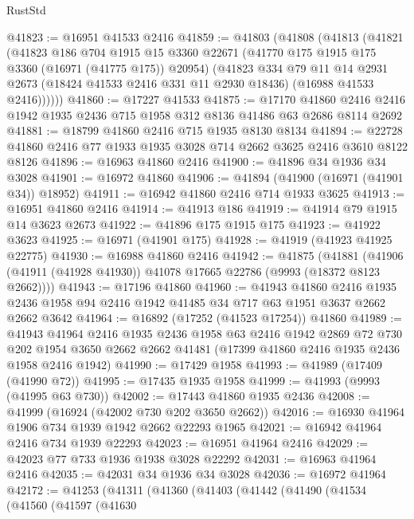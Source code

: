 \begin{lexlean}{RustStd}
\begin{coremodule}
@41823 := @16951 @41533 @2416
@41859 := @41803
    (@41808
      (@41813
        (@41821
          (@41823
            @186
            @704
            @1915
            @15
            @3360
            @22671
            (@41770 @175 @1915 @175 @3360 (@16971 (@41775 @175)) @20954)
            (@41823
              @334
              @79
              @11
              @14
              @2931
              @2673
              (@18424 @41533 @2416 @331 @11 @2930 @18436)
              (@16988 @41533 @2416))))))
@41860 := @17227 @41533
@41875 := @17170
    @41860
    @2416
    @2416
    @1942
    @1935
    @2436
    @715
    @1958
    @312
    @8136
    @41486
    @63
    @2686
    @8114
    @2692
@41881 := @18799 @41860 @2416 @715 @1935 @8130 @8134
@41894 := @22728 @41860 @2416 @77 @1933 @1935 @3028 @714 @2662 @3625 @2416 @3610 @8122 @8126
@41896 := @16963 @41860 @2416
@41900 := @41896 @34 @1936 @34 @3028
@41901 := @16972 @41860
@41906 := @41894 (@41900 (@16971 (@41901 @34)) @18952)
@41911 := @16942 @41860 @2416 @714 @1933 @3625
@41913 := @16951 @41860 @2416
@41914 := @41913 @186
@41919 := @41914 @79 @1915 @14 @3623 @2673
@41922 := @41896 @175 @1915 @175
@41923 := @41922 @3623
@41925 := @16971 (@41901 @175)
@41928 := @41919 (@41923 @41925 @22775)
@41930 := @16988 @41860 @2416
@41942 := @41875
    (@41881 (@41906 (@41911 (@41928 @41930)) @41078 @17665 @22786 (@9993 (@18372 @8123 @2662))))
@41943 := @17196 @41860
@41960 := @41943
    @41860
    @2416
    @1935
    @2436
    @1958
    @94
    @2416
    @1942
    @41485
    @34
    @717
    @63
    @1951
    @3637
    @2662
    @2662
    @3642
@41964 := @16892 (@17252 (@41523 @17254)) @41860
@41989 := @41943
    @41964
    @2416
    @1935
    @2436
    @1958
    @63
    @2416
    @1942
    @2869
    @72
    @730
    @202
    @1954
    @3650
    @2662
    @2662
    @41481
    (@17399 @41860 @2416 @1935 @2436 @1958 @2416 @1942)
@41990 := @17429 @1958
@41993 := @41989 (@17409 (@41990 @72))
@41995 := @17435 @1935 @1958
@41999 := @41993 (@9993 (@41995 @63 @730))
@42002 := @17443 @41860 @1935 @2436
@42008 := @41999 (@16924 (@42002 @730 @202 @3650 @2662))
@42016 := @16930 @41964 @1906 @734 @1939 @1942 @2662 @22293 @1965
@42021 := @16942 @41964 @2416 @734 @1939 @22293
@42023 := @16951 @41964 @2416
@42029 := @42023 @77 @733 @1936 @1938 @3028 @22292
@42031 := @16963 @41964 @2416
@42035 := @42031 @34 @1936 @34 @3028
@42036 := @16972 @41964
@42172 := @41253
    (@41311
      (@41360
        (@41403
          (@41442
            (@41490
              (@41534
                (@41560
                  (@41597
                    (@41630

\end{coremodule}
\end{lexlean}
